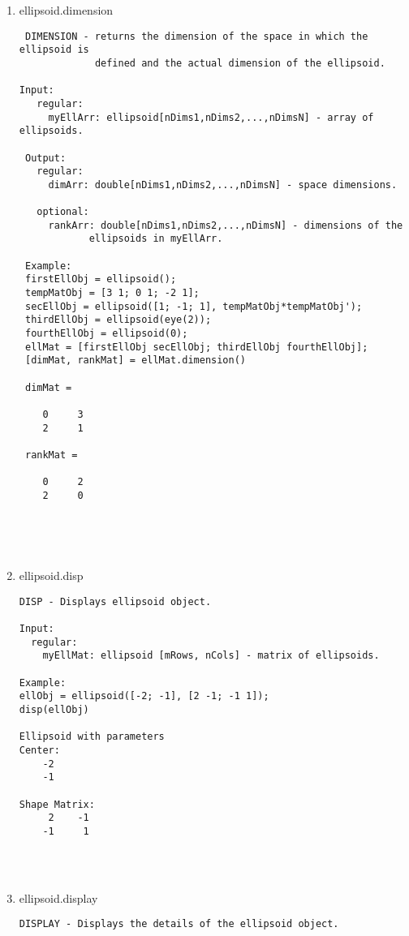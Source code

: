 \begin{enumerate}
\begin{lstlisting}
\end{lstlisting}
\fontfamily{\familydefault}
\selectfont
\item {ellipsoid.dimension}
\selectfont
\begin{lstlisting}
 DIMENSION - returns the dimension of the space in which the ellipsoid is
             defined and the actual dimension of the ellipsoid.

Input:
   regular:
     myEllArr: ellipsoid[nDims1,nDims2,...,nDimsN] - array of ellipsoids.

 Output:
   regular:
     dimArr: double[nDims1,nDims2,...,nDimsN] - space dimensions.

   optional:
     rankArr: double[nDims1,nDims2,...,nDimsN] - dimensions of the
            ellipsoids in myEllArr.

 Example:
 firstEllObj = ellipsoid();
 tempMatObj = [3 1; 0 1; -2 1];
 secEllObj = ellipsoid([1; -1; 1], tempMatObj*tempMatObj');
 thirdEllObj = ellipsoid(eye(2));
 fourthEllObj = ellipsoid(0);
 ellMat = [firstEllObj secEllObj; thirdEllObj fourthEllObj];
 [dimMat, rankMat] = ellMat.dimension()

 dimMat =

    0     3
    2     1

 rankMat =

    0     2
    2     0





\end{lstlisting}
\fontfamily{\familydefault}
\selectfont
\item {ellipsoid.disp}
\selectfont
\begin{lstlisting}
DISP - Displays ellipsoid object.

Input:
  regular:
    myEllMat: ellipsoid [mRows, nCols] - matrix of ellipsoids.

Example:
ellObj = ellipsoid([-2; -1], [2 -1; -1 1]);
disp(ellObj)

Ellipsoid with parameters
Center:
    -2
    -1

Shape Matrix:
     2    -1
    -1     1




\end{lstlisting}
\fontfamily{\familydefault}
\selectfont
\item {ellipsoid.display}
\selectfont
\begin{lstlisting}
DISPLAY - Displays the details of the ellipsoid object.


\end{lstlisting}
\end{enumerate}
